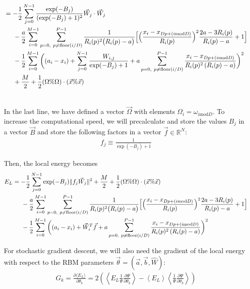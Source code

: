 \documentclass[12pt]{article}
\begin{document}
\begin{align*}
&=-\frac{1}{2} \sum_{j=0}^{N-1}\frac{\exp(-B_j)}{(\exp(-B_j)+1)^2} \vec{W}_j \cdot \vec{W}_j \\
& \hspace*{.5 cm}
-\frac{a}{2} \sum_{i=0}^{M-1} \sum_{p=0, \ p\neq \text{floor}(i/D)}^{P-1}\frac{1}{R_i(p)^2 \big( R_i(p)-a \big)}\Big[ \Big( \frac{x_i-x_{Dp+(i\text{mod}D)}}{R_i(p)} \Big)^2 \frac{2a-3R_i(p)}{R_i(p)-a}+1\Big]  \\
& \hspace*{.5 cm}
-\frac{1}{2} \sum_{i=0}^{M-1} \bigg( 
(a_i -x_i )
+\sum_{j=0}^{N-1}  \frac{W_{i,j}}{\exp(-B_j)+1}
+a\sum_{p=0, \ p\neq \text{floor}(i/D)}^{P-1} \frac{x_i-x_{Dp+(i\text{mod}D)}}{R_i(p)^2 \left( R_i(p) -a \right)}
 \bigg)^2\\
 & \hspace*{.5 cm} + \frac{M}{2}+ \frac{1}{2}(\Omega\%\Omega)\cdot (\vec{x}\% \vec{x})\\ \\ 
\end{align*}

\noindent In the last line, we have defined a vector $\vec{\Omega}$ with elements $\Omega_i = \omega_{i\text{mod}D}$. To increase the computational speed, we will precalculate and store the values $B_j$ in a vector $\vec{B}$ and store the following factors in a vector $\vec{f} \in \mathbb{R}^{N}$:
\begin{align*}
f_j \equiv \frac{1}{\exp(-B_j)+1}
\end{align*}

\noindent Then, the local energy becomes
\begin{align*}
E_L &=-\frac{1}{2} \sum_{j=0}^{N-1}\exp(-B_j) \| f_j\vec{W}_j \|^2 + \frac{M}{2}+ \frac{1}{2}(\Omega\%\Omega)\cdot (\vec{x}\% \vec{x})\\
& \hspace*{.5 cm}
-\frac{a}{2} \sum_{i=0}^{M-1} \sum_{p=0, \ p\neq \text{floor}(i/D)}^{P-1}\frac{1}{R_i(p)^2 \big( R_i(p)-a \big)}\Big[ \Big( \frac{x_i-x_{Dp+(i\text{mod}D)}}{R_i(p)} \Big)^2 \frac{2a-3R_i(p)}{R_i(p)-a}+1\Big]  \\
& \hspace*{.5 cm}
-\frac{1}{2} \sum_{i=0}^{M-1} \bigg( 
(a_i -x_i )
+\vec{W}_i^T\vec{f}
+a\sum_{p=0, \ p\neq \text{floor}(i/D)}^{P-1} \frac{x_i-x_{Dp+(i\text{mod}D)}}{R_i(p)^2 \left( R_i(p) -a \right)}
 \bigg)^2\\
\end{align*}

\noindent For stochastic gradient descent, we will also need the gradient of the local energy with respect to the RBM parameters $\vec{\theta}=(\vec{a},\vec{b},\hat{W})$:
\begin{align*}
G_k = \frac{\partial \langle E_L \rangle}{\partial \theta_k} = 2 \left( \left\langle E_L \frac{1}{\Psi} \frac{\partial \Psi}{\partial \theta_k} \right\rangle - \left\langle E_L \right\rangle \left\langle \frac{1}{\Psi} \frac{\partial \Psi}{\partial \theta_k} \right\rangle \right)\\
\end{align*}
\end{document}
